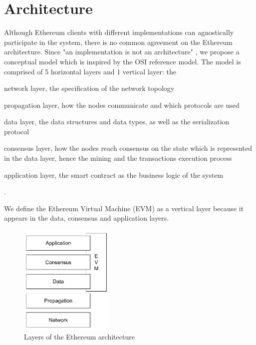\section{Architecture}


Although Ethereum clients with different implementations can agnostically
participate in the system, there is no common agreement on the Ethereum
architecture. Since "an implementation is not an architecture"
\cite{bib:art-of-scalability}, we propose a conceptual model which is inspired
by the OSI reference model. The model is comprised of 5 horizontal layers and 1
vertical layer: the
\begin{enumerate*}[label=(\arabic*)]
  \item network layer, the specification of the network topology
  \item propagation layer, how the nodes communicate and which protocols
  are used
  \item data layer, the data structures and data types, as well as the
  serialization protocol
  \item consensus layer, how the nodes reach consensus on the state which is
  represented in the data layer, hence the mining and the transactions execution
  process
  \item application layer, the smart contract as the business logic of the
  system
\end{enumerate*}.

We define the Ethereum Virtual Machine (EVM) as a vertical layer because it
appears in the data, consensus and application layers.

\begin{figure}[H]
	\begin{center}
		\includegraphics[width=0.4\textwidth]{./res/img/architecture.pdf}
	\end{center}
	\caption{Layers of the Ethereum architecture}
	\label{fig:architecture}
\end{figure}

